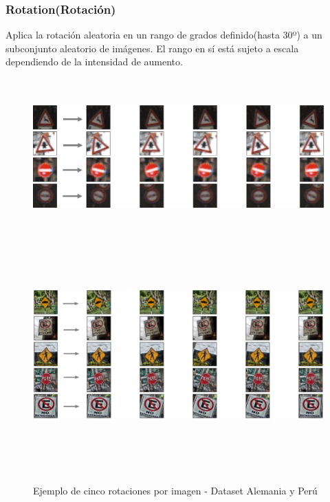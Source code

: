 		\subsubsection{Rotation(Rotación)}
			Aplica la rotación aleatoria en un rango de grados definido(hasta 30º) a un subconjunto aleatorio de imágenes.
	        El rango en sí está sujeto a escala dependiendo de la intensidad de aumento.

	        \begin{figure}[H]
				\begin{center}
				\includegraphics[width=1\textwidth,height=6cm]{images/desarrollo/Augment/fixedrotation3}
				\includegraphics[width=1\textwidth,height=9cm]{images/desarrollo/Augment/fixedrotation2}
				\end{center}
				\begin{center}
				\caption{\small{Ejemplo de cinco rotaciones por imagen - Dataset Alemania y Perú}}
				{\small{\fontsize{10}{16.8}\selectfont {Fuente: Elaboración propia}}}
				\end{center}
				\vspace{-1.5em}
			\end{figure}
	    
